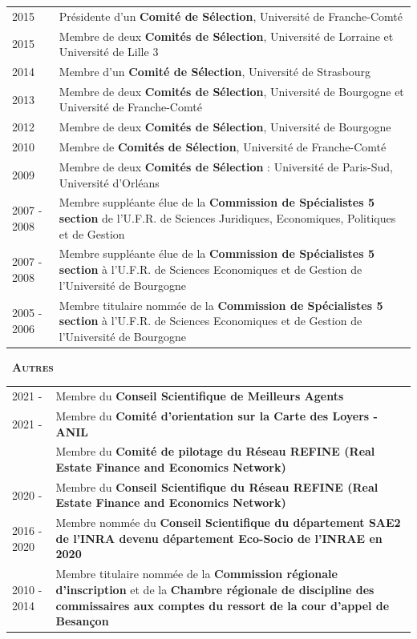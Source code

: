 \documentclass[a4paper,12pt]{article}
\newcommand{\smalltitre}[1]{%
	\noindent \textbullet~\textsc{\textbf{#1}}
	\smallskip
	}
\begin{document}
\begin{longtable}{@{}p{\annee}p{\texte}@{}}
2015 		& Présidente d'un \textbf{Comité de Sélection}, Université de Franche-Comté \\	
2015		& Membre de deux \textbf{Comités de Sélection}, Université de Lorraine et Université de Lille 3 \\
2014 		& Membre d'un \textbf{Comité de Sélection}, Université de Strasbourg \\
2013 		& Membre de deux \textbf{Comités de Sélection}, Université de Bourgogne et Université de Franche-Comté \\
2012 		& Membre de deux \textbf{Comités de Sélection}, Université de Bourgogne \\
2010 		& Membre de \textbf{Comités de Sélection}, Université de Franche-Comté \\
2009 		& Membre de deux \textbf{Comités de Sélection} : Université de Paris-Sud, Université d'Orléans \\
2007 - 2008 & Membre suppléante élue de la \textbf{Commission de Spécialistes 5\ieme{} section} de l'U.F.R. de Sciences Juridiques, Economiques, Politiques et de Gestion \\
2007 - 2008 & Membre suppléante élue de la \textbf{Commission de Spécialistes 5\ieme{} section} à l'U.F.R. de Sciences Economiques et de Gestion de l'Université de Bourgogne \\
2005 - 2006 & Membre titulaire nommée de la \textbf{Commission de Spécialistes 5\ieme{} section} à l'U.F.R. de Sciences Economiques et de Gestion de l'Université de Bourgogne
\end{longtable}

\smalltitre{Autres}

\noindent \begin{longtable}{@{}p{\annee}p{\texte}@{}}
2021 - 	& Membre du \textbf{Conseil Scientifique de Meilleurs Agents} \\
2021 - 	& Membre du \textbf{Comité d'orientation sur la Carte des Loyers - ANIL} \\
& Membre du \textbf{Comité de pilotage du Réseau REFINE (Real Estate Finance and Economics Network)} \\
2020 - 	& Membre du \textbf{Conseil Scientifique du Réseau REFINE (Real Estate Finance and Economics Network)} \\
2016 - 2020	& Membre nommée du \textbf{Conseil Scientifique du département SAE2 de l'INRA devenu département Eco-Socio de l'INRAE en 2020} \\
2010 - 2014	& Membre titulaire nommée de la \textbf{Commission régionale d'inscription} et de la \textbf{Chambre régionale de discipline des commissaires aux comptes du ressort de la cour d'appel de Besançon} 
\end{longtable}
\end{document}
